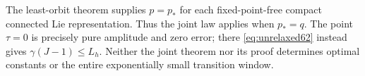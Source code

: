 The least-orbit theorem supplies $p=p_*$ for each fixed-point-free
compact connected Lie representation. Thus the joint law applies when
$p_*=q$. The point $\tau=0$ is precisely pure amplitude and zero error;
there \eqref{eq:unrelaxed62} instead gives $\gamma(J-1)\le L_h$.
Neither the joint theorem nor its proof determines optimal constants
or the entire exponentially small transition window.
